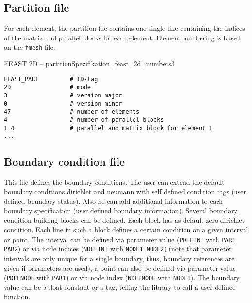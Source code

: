 
\subsection*{Partition file}
For each element, the partition file contains one single line containing the
indices of the matrix and parallel blocks for each element. Element numbering
is based on the \texttt{fmesh} file.
\begin{code}{FEAST 2D -- partition}{Spezifikation_feast_2d_numbers3}
\begin{verbatim}
FEAST_PART         # ID-tag
2D                 # mode
3                  # version major
0                  # version minor
47                 # number of elements
4                  # number of parallel blocks
1 4                # parallel and matrix block for element 1
...
\end{verbatim}
\end{code}





\subsection*{Boundary condition file}

This file defines the boundary conditions. The user can extend the default boundary conditions
dirichlet and neumann with self defined condition tags (user defined boundary status). 
Also he can add additional information to each boundary specification (user defined boundary information).
Several boundary condition building blocks can be defined. Each block has as default zero dirichlet condition.
Each line in such a block defines a certain condition on a given interval or point. The interval can be
defined via parameter value (\verb+PDEFINT+ with \verb+PAR1 PAR2+) or via node
indices (\verb+NDEFINT+ with \verb+NODE1 NODE2+) (note that parameter
intervals are only unique for a single boundary, thus, boundary references are
given if parameters are used), 
a point can also be defined via parameter value (\verb+PDEFNODE+ with \verb+PAR1+) or via node index (\verb+NDEFNODE+ with \verb+NODE1+).
The boundary value can be a float constant or a tag, telling the library to call a user defined function.

